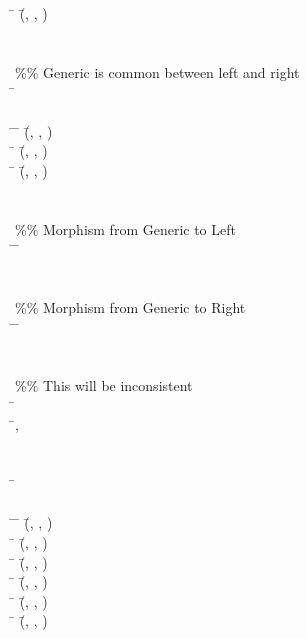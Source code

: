 \documentclass{AISB2008}
\begin{document}
\begin{listing}[H]
{\begin{hetcasl}
\> \Ax{\bullet} \= (\=, , ) \Ax{=} \\
\\
\\
\%\% Generic is common between left and right\\
\SPEC \= \Ax{=}\\
\> \\
\THEN \=\Ax{\bullet} \= (\=, , ) \Ax{=} \\
\> \Ax{\bullet} \= (\=, , ) \Ax{=} \\
\> \Ax{\bullet} \= (\=, , ) \Ax{=} \\
\\
\\
\%\% Morphism from Generic to Left\\
\VIEW \= \Ax{:} \=  \\
\\
\\
\%\% Morphism from Generic to Right\\
\VIEW \= \Ax{:} \=  \\
\\
\\
\%\% This will be inconsistent\\
\SPEC \= \Ax{=}\\
\>  \=, \\
\\
\\
\SPEC \= \Ax{=}\\
\> \\
\THEN \=\Ax{\bullet} \= (\=, , ) \Ax{=} \\
\> \Ax{\bullet} \= (\=, , ) \Ax{=} \\
\> \Ax{\bullet} \= (\=, , ) \Ax{=} \\
\> \Ax{\bullet} \= (\=, , ) \Ax{=} \\
\> \Ax{\bullet} \= (\=, , ) \Ax{=} \\
\> \Ax{\bullet} \= (\=, , ) \Ax{=} \\

\end{hetcasl}}
\end{listing}
\end{document}
